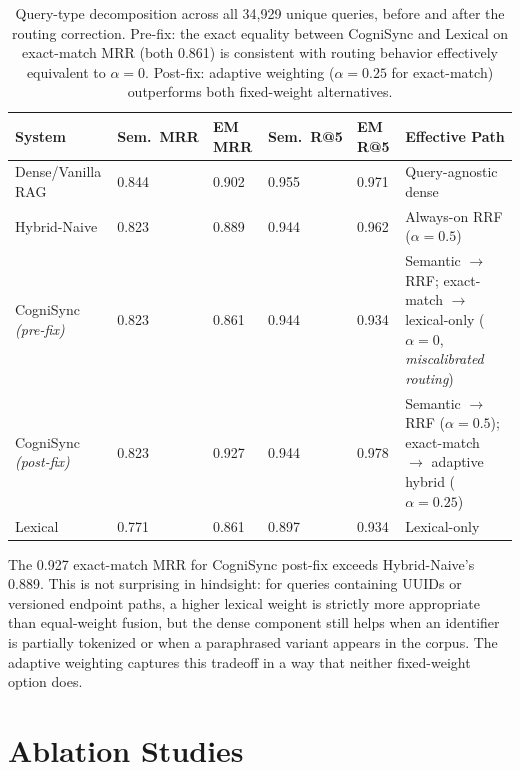 \documentclass[sigconf]{acmart}
\begin{document}
\begin{table}[t]
\caption{%
  Query-type decomposition across all 34,929 unique queries, before and after
  the routing correction. Pre-fix: the exact equality between CogniSync
  and Lexical on exact-match MRR (both 0.861) is consistent with routing behavior effectively equivalent to $\alpha=0$. Post-fix: adaptive weighting ($\alpha=0.25$ for
  exact-match) outperforms both fixed-weight alternatives.%
}
\label{tab:routing}
\footnotesize\setlength{\tabcolsep}{3.5pt}
\begin{tabularx}{\textwidth}{@{}LYYYYL@{}}
\toprule
\textbf{System} &
  \textbf{Sem.\ MRR} & \textbf{EM MRR} &
  \textbf{Sem.\ R@5} & \textbf{EM R@5} &
  \textbf{Effective Path} \\
\midrule
Dense/Vanilla RAG              & 0.844 & 0.902 & 0.955 & 0.971 &
  Query-agnostic dense \\
Hybrid-Naive                   & 0.823 & 0.889 & 0.944 & 0.962 &
  Always-on RRF ($\alpha=0.5$) \\
CogniSync \textit{(pre-fix)}   & 0.823 & 0.861 & 0.944 & 0.934 &
  Semantic $\to$ RRF; exact-match $\to$ lexical-only ($\alpha=0$, \textit{miscalibrated routing}) \\
CogniSync \textit{(post-fix)}  & 0.823 & 0.927 & 0.944 & 0.978 &
  Semantic $\to$ RRF ($\alpha=0.5$); exact-match $\to$ adaptive hybrid ($\alpha=0.25$) \\
Lexical                        & 0.771 & 0.861 & 0.897 & 0.934 &
  Lexical-only \\
\bottomrule
\end{tabularx}
\end{table}

The 0.927 exact-match MRR for CogniSync post-fix exceeds Hybrid-Naive's
0.889. This is not surprising in hindsight: for queries containing UUIDs
or versioned endpoint paths, a higher lexical weight is strictly more
appropriate than equal-weight fusion, but the dense component still helps
when an identifier is partially tokenized or when a paraphrased variant
appears in the corpus. The adaptive weighting captures this tradeoff in
a way that neither fixed-weight option does.

\section{Ablation Studies}
\end{document}

